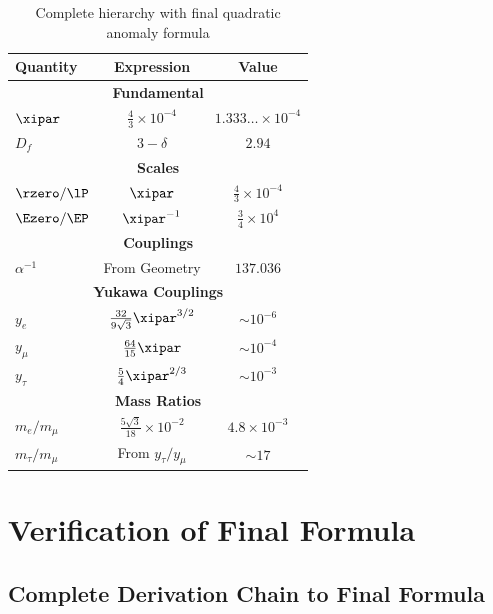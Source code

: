 	\begin{table}[h]
		\centering
		\begin{tabular}{lcc}
			\toprule
			\textbf{Quantity} & \textbf{Expression} & \textbf{Value} \\
			\midrule
			\multicolumn{3}{c}{\textbf{Fundamental}} \\
			$\xipar$ & $\frac{4}{3} \times 10^{-4}$ & $1.333\ldots \times 10^{-4}$ \\
			$D_f$ & $3 - \delta$ & $2.94$ \\
			\midrule
			\multicolumn{3}{c}{\textbf{Scales}} \\
			$\rzero/\lP$ & $\xipar$ & $\frac{4}{3} \times 10^{-4}$ \\
			$\Ezero/\EP$ & $\xipar^{-1}$ & $\frac{3}{4} \times 10^{4}$ \\
			\midrule
			\multicolumn{3}{c}{\textbf{Couplings}} \\
			$\alpha^{-1}$ & From Geometry & $137.036$ \\
			\midrule
			\multicolumn{3}{c}{\textbf{Yukawa Couplings}} \\
			$y_e$ & $\frac{32}{9\sqrt{3}} \xipar^{3/2}$ & $\sim 10^{-6}$ \\
			$y_\mu$ & $\frac{64}{15} \xipar$ & $\sim 10^{-4}$ \\
			$y_\tau$ & $\frac{5}{4} \xipar^{2/3}$ & $\sim 10^{-3}$ \\
			\midrule
			\multicolumn{3}{c}{\textbf{Mass Ratios}} \\
			$m_e/m_\mu$ & $\frac{5 \sqrt{3}}{18} \times 10^{-2}$ & $4.8 \times 10^{-3}$ \\
			$m_\tau/m_\mu$ & From $y_\tau/y_\mu$ & $\sim 17$ \\
			\midrule

		\end{tabular}
		\caption{Complete hierarchy with final quadratic anomaly formula}
	\end{table}
	
	\section{Verification of Final Formula}
	
	\subsection{Complete Derivation Chain to Final Formula}
	

